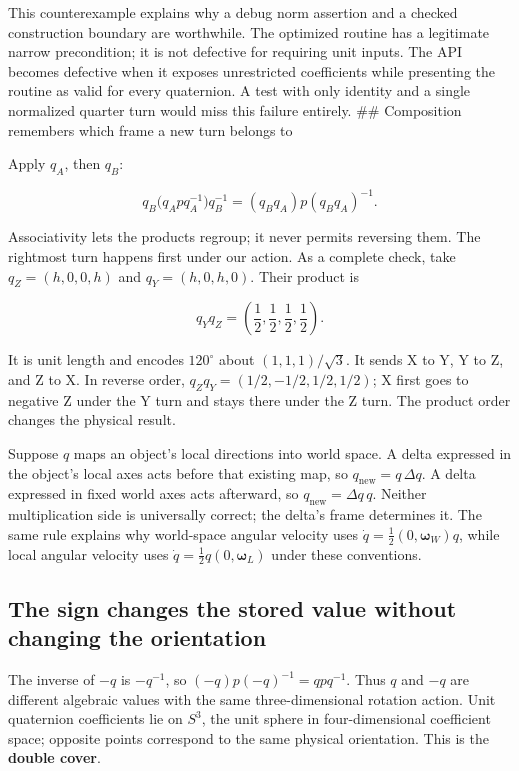 This counterexample explains why a debug norm assertion and a checked construction boundary are worthwhile. The optimized routine has a legitimate narrow precondition; it is not defective for requiring unit inputs. The API becomes defective when it exposes unrestricted coefficients while presenting the routine as valid for every quaternion. A test with only identity and a single normalized quarter turn would miss this failure entirely. \#\# Composition remembers which frame a new turn belongs to

Apply \(q_A\), then \(q_B\):

\[
q_B\bigl(q_Apq_A^{-1}\bigr)q_B^{-1}
=(q_Bq_A)p(q_Bq_A)^{-1}.
\]

Associativity lets the products regroup; it never permits reversing them. The rightmost turn happens first under our action. As a complete check, take \(q_Z=(h,0,0,h)\) and \(q_Y=(h,0,h,0)\). Their product is

\[
q_Yq_Z=\left(\frac12,\frac12,\frac12,\frac12\right).
\]

It is unit length and encodes \(120^\circ\) about \((1,1,1)/\sqrt3\). It sends X to Y, Y to Z, and Z to X. In reverse order, \(q_Zq_Y=(1/2,-1/2,1/2,1/2)\); X first goes to negative Z under the Y turn and stays there under the Z turn. The product order changes the physical result.

Suppose \(q\) maps an object's local directions into world space. A delta expressed in the object's local axes acts before that existing map, so \(q_{\mathrm{new}}=q\,\Delta q\). A delta expressed in fixed world axes acts afterward, so \(q_{\mathrm{new}}=\Delta q\,q\). Neither multiplication side is universally correct; the delta's frame determines it. The same rule explains why world-space angular velocity uses \(\dot q=\tfrac12(0,\boldsymbol\omega_W)q\), while local angular velocity uses \(\dot q=\tfrac12q(0,\boldsymbol\omega_L)\) under these conventions.

\subsection{The sign changes the stored value without changing the orientation}\label{01-foundations-i-ch019-the-sign-changes-the-stored-value-without-changing-the-orientation}

The inverse of \(-q\) is \(-q^{-1}\), so \((-q)p(-q)^{-1}=qpq^{-1}\). Thus \(q\) and \(-q\) are different algebraic values with the same three-dimensional rotation action. Unit quaternion coefficients lie on \(S^3\), the unit sphere in four-dimensional coefficient space; opposite points correspond to the same physical orientation. This is the \textbf{double cover}.

